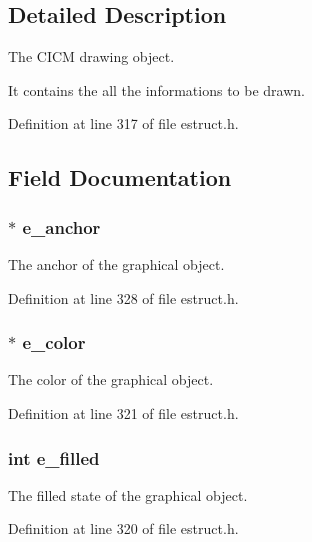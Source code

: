 \subsection{Detailed Description}
The C\-I\-C\-M drawing object. 

It contains the all the informations to be drawn. 

Definition at line 317 of file estruct.\-h.



\subsection{Field Documentation}
\hypertarget{struct__egobj_a26003aea4ac1d50f79a5db2e05599222}{
\subsubsection[{e\-\_\-anchor}]{$\ast$ e\-\_\-anchor}}\label{struct__egobj_a26003aea4ac1d50f79a5db2e05599222}
The anchor of the graphical object. 

Definition at line 328 of file estruct.\-h.

\hypertarget{struct__egobj_a13dfb00aea95e0dc5b9d1297260a9280}{
\subsubsection[{e\-\_\-color}]{$\ast$ e\-\_\-color}}\label{struct__egobj_a13dfb00aea95e0dc5b9d1297260a9280}
The color of the graphical object. 

Definition at line 321 of file estruct.\-h.

\hypertarget{struct__egobj_ae13e50cb319a060b3e612c39d0fc698d}{
\subsubsection[{e\-\_\-filled}]{\setlength{\rightskip}{0pt plus 5cm}int e\-\_\-filled}}\label{struct__egobj_ae13e50cb319a060b3e612c39d0fc698d}
The filled state of the graphical object. 

Definition at line 320 of file estruct.\-h.

